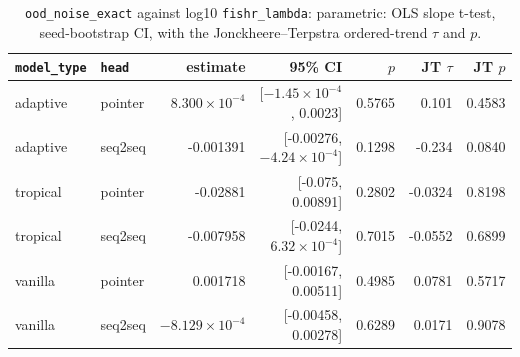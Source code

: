 \documentclass[10pt]{article}
\begin{document}
{\small
\begin{longtable}{llrrrrr}
\caption{\texttt{ood\_noise\_exact} against log10 \texttt{fishr\_lambda}: parametric: OLS slope t-test, seed-bootstrap CI, with the Jonckheere--Terpstra ordered-trend $\tau$ and $p$.}\label{tab:trend-ood_noise_exact}\\
\toprule
\texttt{model\_type} & \texttt{head} & estimate & 95\% CI & $p$ & JT $\tau$ & JT $p$\\
\midrule
\endhead
adaptive & pointer & $8.300\times10^{-4}$ & [$-1.45\times10^{-4}$, 0.0023] & 0.5765 & 0.101 & 0.4583\\
adaptive & seq2seq & -0.001391 & [-0.00276, $-4.24\times10^{-4}$] & 0.1298 & -0.234 & 0.0840\\
tropical & pointer & -0.02881 & [-0.075, 0.00891] & 0.2802 & -0.0324 & 0.8198\\
tropical & seq2seq & -0.007958 & [-0.0244, $6.32\times10^{-4}$] & 0.7015 & -0.0552 & 0.6899\\
vanilla & pointer & 0.001718 & [-0.00167, 0.00511] & 0.4985 & 0.0781 & 0.5717\\
vanilla & seq2seq & $-8.129\times10^{-4}$ & [-0.00458, 0.00278] & 0.6289 & 0.0171 & 0.9078\\
\bottomrule
\end{longtable}
}
\end{document}
